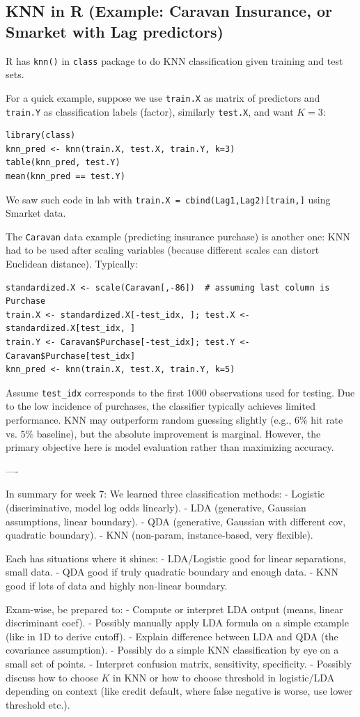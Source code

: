\documentclass[11pt]{article}
\begin{document}
\subsection{KNN in R (Example: Caravan Insurance, or Smarket with Lag predictors)}
R has \texttt{knn()} in \texttt{class} package to do KNN classification given training and test sets.

For a quick example, suppose we use \texttt{train.X} as matrix of predictors and \texttt{train.Y} as classification labels (factor), similarly \texttt{test.X}, and want $K=3$:
\begin{verbatim}
library(class)
knn_pred <- knn(train.X, test.X, train.Y, k=3)
table(knn_pred, test.Y)
mean(knn_pred == test.Y)
\end{verbatim}
We saw such code in lab with \texttt{train.X = cbind(Lag1,Lag2)[train,]} using Smarket data.

The \texttt{Caravan} data example (predicting insurance purchase) is another one: KNN had to be used after scaling variables (because different scales can distort Euclidean distance). Typically:
\begin{verbatim}
standardized.X <- scale(Caravan[,-86])  # assuming last column is Purchase
train.X <- standardized.X[-test_idx, ]; test.X <- standardized.X[test_idx, ]
train.Y <- Caravan$Purchase[-test_idx]; test.Y <- Caravan$Purchase[test_idx]
knn_pred <- knn(train.X, test.X, train.Y, k=5)
\end{verbatim}
Assume \texttt{test\_idx} corresponds to the first 1000 observations used for testing. Due to the low incidence of purchases, the classifier typically achieves limited performance. KNN may outperform random guessing slightly (e.g., $6\%$ hit rate vs. $5\%$ baseline), but the absolute improvement is marginal. However, the primary objective here is model evaluation rather than maximizing accuracy.

----

In summary for week 7: We learned three classification methods:
- Logistic (discriminative, model log odds linearly).
- LDA (generative, Gaussian assumptions, linear boundary).
- QDA (generative, Gaussian with different cov, quadratic boundary).
- KNN (non-param, instance-based, very flexible).

Each has situations where it shines:
- LDA/Logistic good for linear separations, small data.
- QDA good if truly quadratic boundary and enough data.
- KNN good if lots of data and highly non-linear boundary.

Exam-wise, be prepared to:
- Compute or interpret LDA output (means, linear discriminant coef).
- Possibly manually apply LDA formula on a simple example (like in 1D to derive cutoff).
- Explain difference between LDA and QDA (the covariance assumption).
- Possibly do a simple KNN classification by eye on a small set of points.
- Interpret confusion matrix, sensitivity, specificity.
- Possibly discuss how to choose $K$ in KNN or how to choose threshold in logistic/LDA depending on context (like credit default, where false negative is worse, use lower threshold etc.).
\end{document}
